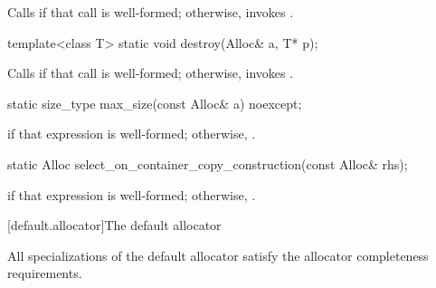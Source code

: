 \begin{itemdescr}
\pnum
\effects Calls 
if that call is well-formed;
otherwise, invokes .
\end{itemdescr}

%
\begin{itemdecl}
template<class T>
  static void destroy(Alloc& a, T* p);
\end{itemdecl}

\begin{itemdescr}
\pnum
\effects Calls  if that call is well-formed; otherwise, invokes
.
\end{itemdescr}

%
\begin{itemdecl}
static size_type max_size(const Alloc& a) noexcept;
\end{itemdecl}

\begin{itemdescr}
\pnum
\returns {} if that expression is well-formed; otherwise,
.
\end{itemdescr}

%
\begin{itemdecl}
static Alloc select_on_container_copy_construction(const Alloc& rhs);
\end{itemdecl}

\begin{itemdescr}
\pnum
\returns {} if that expression is
well-formed; otherwise, .
\end{itemdescr}

[default.allocator]{The default allocator}

\pnum
All specializations of the default allocator satisfy the
allocator completeness requirements.

